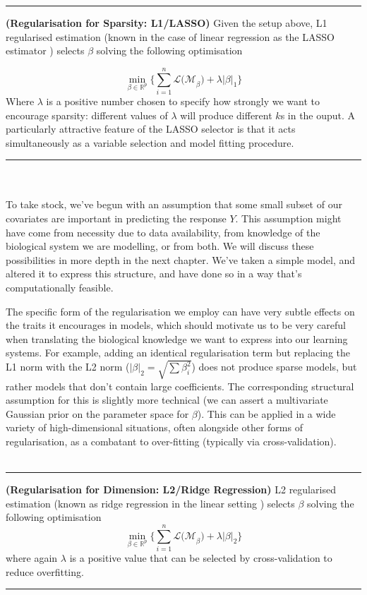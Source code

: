 \documentclass[thesis.tex]{subfiles}
\begin{document}
\hrule
\begin{technique}{\textbf{(Regularisation for Sparsity: L1/LASSO)}} \label{sec:lasso}
Given the setup above, L1 regularised estimation (known in the case of linear regression as the LASSO estimator \citep{tibshirani_regression_1996}) selects $\beta$ solving the following optimisation

$$\min_{\beta \in \mathbb{R}^p} \{\sum\limits_{i = 1}^{n} \mathcal{L(M}_\beta) + \lambda |\beta|_1 \} $$
Where $\lambda$ is a positive number chosen to specify how strongly we want to encourage sparsity: different values of $\lambda$ will produce different $k$s in the ouput. A particularly attractive feature of the LASSO selector is that it acts simultaneously as a variable selection and model fitting procedure.
\end{technique}
\hrule ~ \\ ~ \\

To take stock, we've begun with an assumption that some small subset of our covariates are important in predicting the response $Y$. This assumption might have come from necessity due to data availability, from knowledge of the biological system we are modelling, or from both. We will discuss these possibilities in more depth in the next chapter. We've taken a simple model, and altered it to express this structure, and have done so in a way that's computationally feasible. 

The specific form of the regularisation we employ can have very subtle effects on the traits it encourages in models, which should motivate us to be very careful when translating the biological knowledge we want to express into our learning systems. For example, adding an identical regularisation term but replacing the L1 norm with the L2 norm ($|\beta|_2 = \sqrt{\sum \beta_i^2}$) does not produce sparse models, but rather models that don't contain large coefficients. The corresponding structural assumption for this is slightly more technical (we can assert a multivariate Gaussian prior on the parameter space for $\beta$). This can be applied in a wide variety of high-dimensional situations, often alongside other forms of regularisation, as a combatant to over-fitting (typically via cross-validation). \\ ~ \\


\hrule
\begin{technique}{\textbf{(Regularisation for Dimension: L2/Ridge Regression)}}
L2 regularised estimation (known as ridge regression in the linear setting \citep{hoerl_ridge_2000}) selects $\beta$ solving the following optimisation
$$\min_{\beta \in \mathbb{R}^p} \{\sum\limits_{i = 1}^{n} \mathcal{L(M}_\beta) + \lambda |\beta|_2 \} $$
where again $\lambda$ is a positive value that can be selected by cross-validation to reduce overfitting.
\end{technique}
\hrule ~ \\ ~ \\
\end{document}
